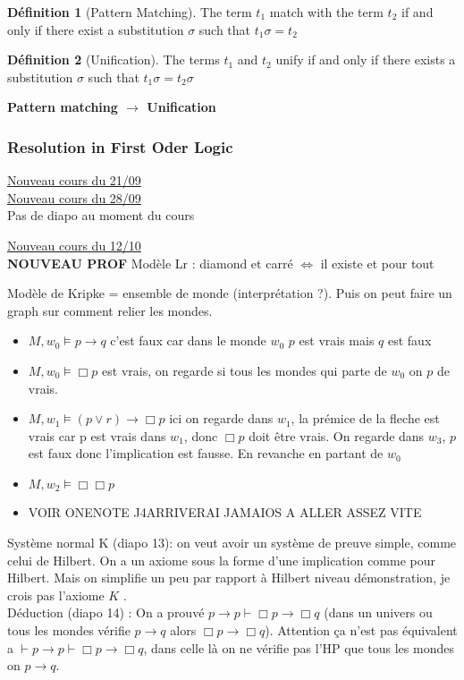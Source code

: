 \documentclass{article}
\theoremstyle{plain}%
\theoremstyle{definition}
\newtheorem{defn}{Définition}[section]
\theoremstyle{remark}
\begin{document}
\begin{defn}[Pattern Matching]
    The term $ t_1 $ match with the term $ t_2 $ if and only if there exist a substitution $ \sigma  $ such that $ t_1 \sigma = t_2 $ 
\end{defn}
\begin{defn}[Unification]
    The terms $ t_1 $ and $ t_2 $  unify if and only if there exists a substitution $ \sigma  $ such that $ t_1 \sigma = t_2 \sigma  $ 
\end{defn}
\textbf{Pattern matching $\rightarrow$ Unification}

\subsubsection{Resolution in First Oder Logic}

\underline{Nouveau cours du 21/09} \\
\underline{Nouveau cours du 28/09} \\
Pas de diapo au moment du cours

\underline{Nouveau cours du 12/10} \\
\textbf{NOUVEAU PROF}
Modèle Lr : diamond et carré $\Leftrightarrow$ il existe et pour tout 

Modèle de Kripke = ensemble de monde (interprétation ?). Puis on peut faire un graph sur comment relier les mondes. \begin{itemize}
    \item $ M, w_0\models p \rightarrow q $ c'est faux car dans le monde $ w_0 $ $ p $ est vrais mais $ q $ est faux
    \item $ M, w_0\models \Box p $ est vrais, on regarde si tous les mondes qui parte de $ w_0 $ on $ p $ de vrais.
    \item $ M, w_1 \models (p \vee r) \rightarrow \Box p$ ici on regarde dans $ w_1 $, la prémice de la fleche est vrais car p est vrais dans $ w_1 $, donc $ \Box p $ doit être vrais. On regarde dans $ w_3 $, $ p $ est faux donc l'implication est fausse. En revanche en partant de $ w_0 $ 
    \item $ M, w_2 \models \Box \Box p $ 
    \item VOIR ONENOTE J4ARRIVERAI JAMAIOS A ALLER ASSEZ VITE 
\end{itemize}

Système normal K (diapo 13): on veut avoir un système de preuve simple, comme celui de Hilbert. On a un axiome sous la forme d'une implication comme pour Hilbert. Mais on simplifie un peu par rapport à Hilbert niveau démonstration, je crois pas l'axiome $ K $ . \\
Déduction (diapo 14) : On a prouvé $ p \rightarrow p \vdash \Box p \rightarrow \Box q $ (dans un univers ou tous les mondes vérifie $ p \rightarrow q $ alors $ \Box p \rightarrow \Box q $). Attention ça n'est pas équivalent a $ \vdash p \rightarrow p \vdash \Box p \rightarrow \Box q$, dans celle là on ne vérifie pas l'HP que tous les mondes on $ p \rightarrow q $. 
\end{document}
